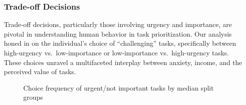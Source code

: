 \documentclass[
]{article}
\begin{document}
\begin{table}
\begin{minipage}[t]{\linewidth}
{\begin{center}
\label{table:coefficients}
\end{center}

}

\end{minipage}%

\end{table}

\hypertarget{trade-off-decisions}{%
\subsubsection{Trade-off Decisions}\label{trade-off-decisions}}

Trade-off decisions, particularly those involving urgency and
importance, are pivotal in understanding human behavior in task
prioritization. Our analysis honed in on the individual's choice of
``challenging'' tasks, specifically between high-urgency
vs.~low-importance or low-importance vs.~high-urgency tasks. These
choices unravel a multifaceted interplay between anxiety, income, and
the perceived value of tasks.

\begin{figure}

\begin{minipage}[t]{0.50\linewidth}

{\centering 


}

\end{minipage}%
%
\begin{minipage}[t]{0.50\linewidth}

{\centering 


}

\end{minipage}%

\caption{\label{fig-tradeoff-results}Choice frequency of urgent/not
important tasks by median split groups}

\end{figure}
\end{document}
